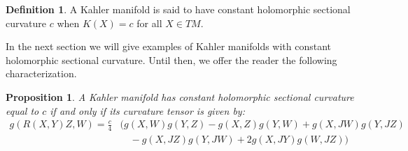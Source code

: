 \documentclass[11pt]{amsart}
\newtheorem{prop}[subsection]{Proposition}
\theoremstyle{definition}
\newtheorem{definition}[subsection]{Definition}
\begin{document}
\begin{definition} A Kahler manifold is said to have constant holomorphic sectional curvature $c$ when $K(X) = c$ for all $X \in TM$.
\end{definition}
%
In the next section we will give examples of Kahler manifolds with constant holomorphic sectional curvature.  Until then, we offer the reader the following characterization.
%
\begin{prop} A Kahler manifold has constant holomorphic sectional curvature equal to $c$ if and only if its curvature tensor is given by:
%
\begin{align*}
g( R(X,Y)Z, W ) = \frac{c}{4} & ( g(X,W)g(Y,Z) - g(X,Z)g(Y,W) + g(X,JW)g(Y,JZ) \\
& \quad - g(X,JZ)g(Y,JW) + 2g(X,JY)g(W,JZ) )
\end{align*}
%
\end{prop}
%
\end{document}
